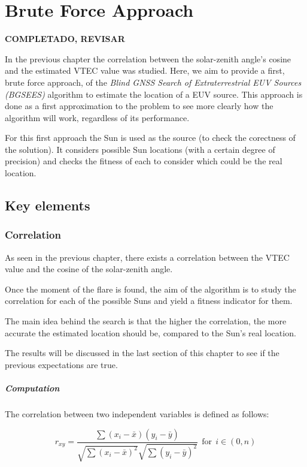 \chapter{Brute Force Approach}

\textbf{COMPLETADO, REVISAR}

In the previous chapter the correlation between the solar-zenith angle's cosine and the estimated VTEC value was studied. Here, we aim to provide a first, brute force approach, of the \textit{Blind GNSS Search of Extraterrestrial EUV Sources (BGSEES)} algorithm to estimate the location of a EUV source. This approach is done as a first approximation to the problem to see more clearly how the algorithm will work, regardless of its performance.

For this first approach the Sun is used as the source (to check the corectness of the solution). It considers possible Sun locations (with a certain degree of precision) and checks the fitness of each to consider which could be the real location.

\section{Key elements}

\subsection{Correlation}

As seen in the previous chapter, there exists a correlation between the VTEC value and the cosine of the solar-zenith angle. 

Once the moment of the flare is found, the aim of the algorithm is to study the correlation for each of the possible Suns and yield a fitness indicator for them. 

The main idea behind the search is that the higher the correlation, the more accurate the estimated location should be, compared to the Sun's real location. 

The results will be discussed in the last section of this chapter to see if the previous expectations are true.

\paragraph{Computation}

The correlation between two independent variables is defined as follows:

\begin{equation} \label{eq:coefficient}
r_{xy} = \frac{\sum(x_{i} - \bar{x})(y_{i} - \bar{y})}
{\sqrt{\sum(x_{i} - \bar{x})^{2}}
	\sqrt{\sum(y_{i} - \bar{y})^{2}}} \ \ \text{for} \ \ i \in (0, n)
\end{equation} \\

